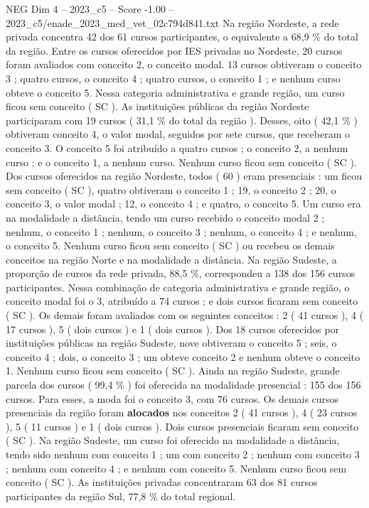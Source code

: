 \begin{textsample}{NEG Dim 4 – 2023\_c5 – Score -1.00 – 2023\_c5/enade\_2023\_med\_vet\_02c794d841.txt}
Na região Nordeste, a rede privada concentra 42 dos 61 cursos participantes, o equivalente a 68,9 \% do total da região.
Entre os cursos oferecidos por IES privadas no Nordeste, 20 cursos foram avaliados com conceito 2, o conceito modal. 13 cursos obtiveram o conceito 3 ; quatro cursos, o conceito 4 ; quatro cursos, o conceito 1 ; e nenhum curso obteve o conceito 5.
Nessa categoria administrativa e grande região, um curso ficou sem conceito ( SC ).
As instituições públicas da região Nordeste participaram com 19 cursos ( 31,1 \% do total da região ).
Desses, oito ( 42,1 \% ) obtiveram conceito 4, o valor modal, seguidos por sete cursos, que receberam o conceito 3.
O conceito 5 foi atribuído a quatro cursos ; o conceito 2, a nenhum curso ; e o conceito 1, a nenhum curso.
Nenhum curso ficou sem conceito ( SC ).
Dos cursos oferecidos na região Nordeste, todos ( 60 ) eram presenciais : um ficou sem conceito ( SC ), quatro obtiveram o conceito 1 ; 19, o conceito 2 ; 20, o conceito 3, o valor modal ; 12, o conceito 4 ; e quatro, o conceito 5.
Um curso era na modalidade a distância, tendo um curso recebido o conceito modal 2 ; nenhum, o conceito 1 ; nenhum, o conceito 3 ; nenhum, o conceito 4 ; e nenhum, o conceito 5.
Nenhum curso ficou sem conceito ( SC ) ou recebeu os demais conceitos na região Norte e na modalidade a distância.
Na região Sudeste, a proporção de cursos da rede privada, 88,5 \%, correspondeu a 138 dos 156 cursos participantes.
Nessa combinação de categoria administrativa e grande região, o conceito modal foi o 3, atribuído a 74 cursos ; e dois cursos ficaram sem conceito ( SC ).
Os demais foram avaliados com os seguintes conceitos : 2 ( 41 cursos ), 4 ( 17 cursos ), 5 ( dois cursos ) e 1 ( dois cursos ).
Dos 18 cursos oferecidos por instituições públicas na região Sudeste, nove obtiveram o conceito 5 ; seis, o conceito 4 ; dois, o conceito 3 ; um obteve conceito 2 e nenhum obteve o conceito 1.
Nenhum curso ficou sem conceito ( SC ).
Ainda na região Sudeste, grande parcela dos cursos ( 99,4 \% ) foi oferecida na modalidade presencial : 155 dos 156 cursos.
Para esses, a moda foi o conceito 3, com 76 cursos.
Os demais cursos presenciais da região foram \textbf{alocados} nos conceitos 2 ( 41 cursos ), 4 ( 23 cursos ), 5 ( 11 cursos ) e 1 ( dois cursos ).
Dois cursos presenciais ficaram sem conceito ( SC ).
Na região Sudeste, um curso foi oferecido na modalidade a distância, tendo sido nenhum com conceito 1 ; um com conceito 2 ; nenhum com conceito 3 ; nenhum com conceito 4 ; e nenhum com conceito 5.
Nenhum curso ficou sem conceito ( SC ).
As instituições privadas concentraram 63 dos 81 cursos participantes da região Sul, 77,8 \% do total regional.

\end{textsample}
